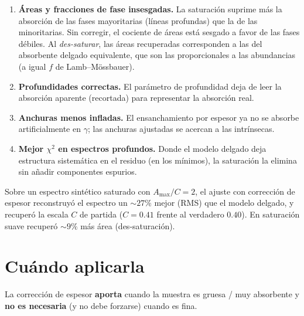 \begin{enumerate}[leftmargin=*]
  \item \textbf{Áreas y fracciones de fase insesgadas.} La saturación suprime más
        la absorción de las fases mayoritarias (líneas profundas) que la de las
        minoritarias. Sin corregir, el cociente de áreas está sesgado a favor de
        las fases débiles. Al \emph{des-saturar}, las áreas recuperadas
        corresponden a las del absorbente delgado equivalente, que son las
        proporcionales a las abundancias (a igual $f$ de Lamb–Mössbauer).
  \item \textbf{Profundidades correctas.} El parámetro de profundidad deja de
        leer la absorción aparente (recortada) para representar la absorción real.
  \item \textbf{Anchuras menos infladas.} El ensanchamiento por espesor ya no se
        absorbe artificialmente en $\gamma$; las anchuras ajustadas se acercan a
        las intrínsecas.
  \item \textbf{Mejor $\chi^2$ en espectros profundos.} Donde el modelo delgado
        deja estructura sistemática en el residuo (en los mínimos), la saturación
        la elimina sin añadir componentes espurios.
\end{enumerate}

\begin{nota}[Verificación]
Sobre un espectro sintético saturado con $A_{\max}/C=2$, el ajuste con corrección
de espesor reconstruyó el espectro un $\sim27\%$ mejor (RMS) que el modelo
delgado, y recuperó la escala $C$ de partida ($C=0.41$ frente al verdadero
$0.40$). En saturación suave recuperó $\sim9\%$ más área (des-saturación).
\end{nota}

\section{Cuándo aplicarla}

\begin{aviso}
La corrección de espesor \textbf{aporta} cuando la muestra es gruesa / muy
absorbente y \textbf{no es necesaria} (y no debe forzarse) cuando es fina.
\end{aviso}

